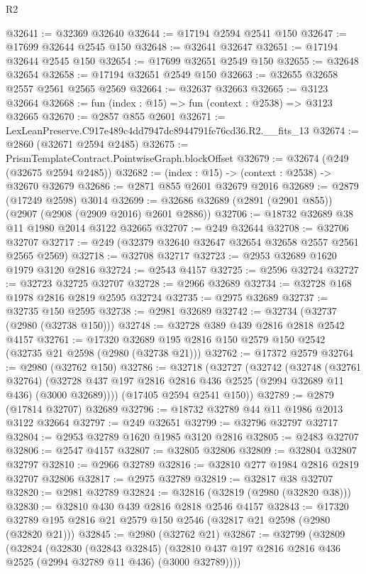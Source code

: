 \begin{lexlean}{R2}
\begin{coremodule}
@32641 := @32369 @32640
@32644 := @17194 @2594 @2541 @150
@32647 := @17699 @32644 @2545 @150
@32648 := @32641 @32647
@32651 := @17194 @32644 @2545 @150
@32654 := @17699 @32651 @2549 @150
@32655 := @32648 @32654
@32658 := @17194 @32651 @2549 @150
@32663 := @32655 @32658 @2557 @2561 @2565 @2569
@32664 := @32637 @32663
@32665 := @3123 @32664
@32668 := fun (index : @15) => fun (context : @2538) => @3123 @32665
@32670 := @2857 @855 @2601
@32671 := LexLeanPreserve.C917e489c4dd7947dc8944791fe76cd36.R2.__fits_13
@32674 := @2860 (@32671 @2594 @2485)
@32675 := PrismTemplateContract.PointwiseGraph.blockOffset
@32679 := @32674 (@249 (@32675 @2594 @2485))
@32682 := (index : @15) -> (context : @2538) -> @32670 @32679
@32686 := @2871 @855 @2601 @32679 @2016
@32689 := @2879 (@17249 @2598) @3014
@32699 := @32686 @32689 (@2891 (@2901 @855)) (@2907 (@2908 (@2909 @2016) @2601 @2886))
@32706 := @18732 @32689 @38 @11 @1980 @2014 @3122 @32665
@32707 := @249 @32644
@32708 := @32706 @32707
@32717 := @249 (@32379 @32640 @32647 @32654 @32658 @2557 @2561 @2565 @2569)
@32718 := @32708 @32717
@32723 := @2953 @32689 @1620 @1979 @3120 @2816
@32724 := @2543 @4157
@32725 := @2596 @32724
@32727 := @32723 @32725 @32707
@32728 := @2966 @32689
@32734 := @32728 @168 @1978 @2816 @2819 @2595 @32724
@32735 := @2975 @32689
@32737 := @32735 @150 @2595
@32738 := @2981 @32689
@32742 := @32734 (@32737 (@2980 (@32738 @150)))
@32748 := @32728 @389 @439 @2816 @2818 @2542 @4157
@32761 := @17320 @32689 @195 @2816 @150 @2579 @150 @2542 (@32735 @21 @2598 (@2980 (@32738 @21)))
@32762 := @17372 @2579
@32764 := @2980 (@32762 @150)
@32786 := @32718
    (@32727
      (@32742
        (@32748
          (@32761 @32764)
          (@32728 @437 @197 @2816 @2816 @436 @2525 (@2994 @32689 @11 @436) (@3000 @32689))))
      (@17405 @2594 @2541 @150))
@32789 := @2879 (@17814 @32707) @32689
@32796 := @18732 @32789 @44 @11 @1986 @2013 @3122 @32664
@32797 := @249 @32651
@32799 := @32796 @32797 @32717
@32804 := @2953 @32789 @1620 @1985 @3120 @2816
@32805 := @2483 @32707
@32806 := @2547 @4157
@32807 := @32805 @32806
@32809 := @32804 @32807 @32797
@32810 := @2966 @32789
@32816 := @32810 @277 @1984 @2816 @2819 @32707 @32806
@32817 := @2975 @32789
@32819 := @32817 @38 @32707
@32820 := @2981 @32789
@32824 := @32816 (@32819 (@2980 (@32820 @38)))
@32830 := @32810 @430 @439 @2816 @2818 @2546 @4157
@32843 := @17320 @32789 @195 @2816 @21 @2579 @150 @2546 (@32817 @21 @2598 (@2980 (@32820 @21)))
@32845 := @2980 (@32762 @21)
@32867 := @32799
    (@32809
      (@32824
        (@32830
          (@32843 @32845)
          (@32810 @437 @197 @2816 @2816 @436 @2525 (@2994 @32789 @11 @436) (@3000 @32789))))

\end{coremodule}
\end{lexlean}
